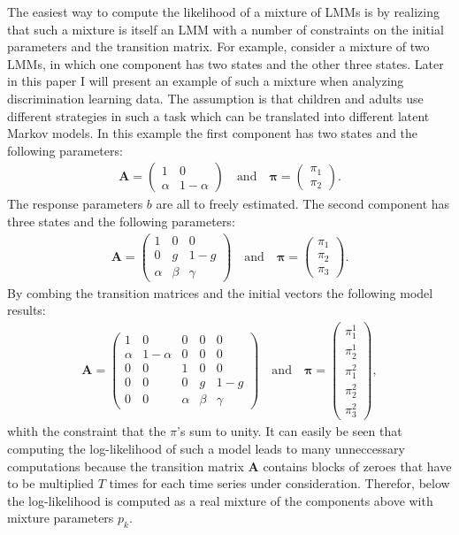 \documentclass[a4paper,man,nobf]{apa}
\newcommand{\mat}{\mathbf}
\begin{document}
The easiest way to compute the likelihood of a mixture of LMMs is by 
realizing that such a mixture is itself an LMM with a number of 
constraints on the initial parameters and the transition matrix. For 
example, consider a mixture of two LMMs, in which one component has 
two states and the other three states. Later in this paper I will 
present an example of such a mixture when  analyzing discrimination 
learning data. The  assumption is that children and adults use 
different strategies in such a task which can be translated into 
different latent Markov models. In this example the first component 
has two states and the following parameters: 
\begin{gather*}
\mat{A} =\begin{pmatrix} 
1 & 0\\ \alpha & 1-\alpha
\end{pmatrix} \quad \text{and} \quad
\pmb{\pi}=\begin{pmatrix} \pi_{1}\\ \pi_{2} \end{pmatrix}.
\end{gather*}
The response parameters $b$ are all to freely estimated. The second 
component has three  states and the following parameters:
\begin{gather*}
\mat{A} =\begin{pmatrix} 
1 & 0 & 0\\ 0 & g & 1-g \\ \alpha & \beta & \gamma
\end{pmatrix} \quad \text{and} \quad
\pmb{\pi}=\begin{pmatrix} \pi_{1}\\\pi_{2}\\\pi_{3}  \end{pmatrix}.
\end{gather*}
By combing the transition matrices and the initial vectors the 
following model results:
\begin{gather*}
\mat{A} =\begin{pmatrix} 
1 & 0 & 0 & 0 & 0\\
\alpha & 1-\alpha & 0 & 0 & 0 \\
0 & 0 & 1 & 0 & 0
\\0 & 0 & 0 & g & 1-g 
\\ 0 & 0 & \alpha & \beta & \gamma
\end{pmatrix} \quad \text{and} \quad
\pmb{\pi}=\begin{pmatrix} \pi_{1}^{1}\\ \pi_{2}^{1}  \\ 
\pi_{1}^{2}\\\pi_{2}^{2}\\\pi_{3}^{2} \end{pmatrix},
\end{gather*}
whith the constraint that the $\pi$'s sum to unity. It can easily be 
seen that computing the log-likelihood of such a model leads to many 
unneccessary computations because the transition matrix $\mat{A}$ 
contains blocks of zeroes that have to be multiplied $T$ times for 
each time series under consideration. Therefor, below the 
log-likelihood is computed as a real mixture of the components above 
with mixture parameters $p_{k}$. 
\end{document}
